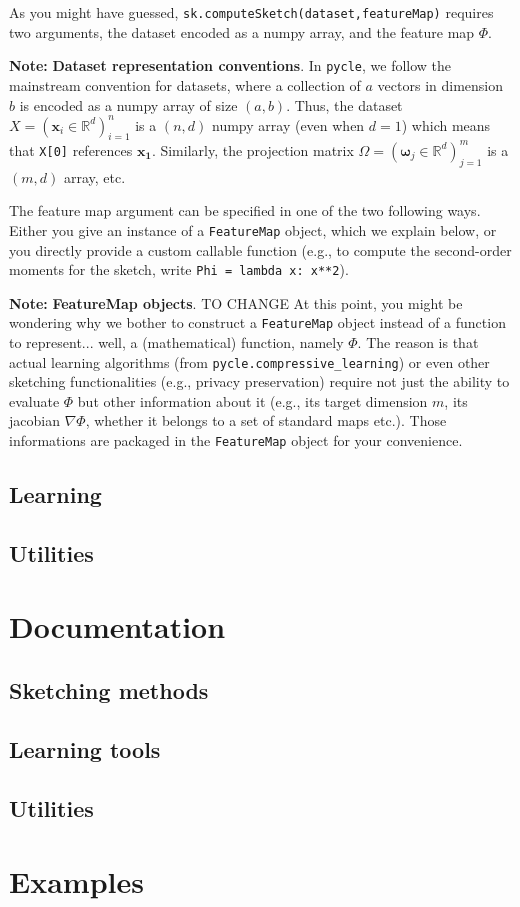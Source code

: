 \documentclass[]{article}
\newcommand{\note}[1]{\begin{noteBox} \textbf{Note:} #1 \end{noteBox}}
\newcommand{\code}{\texttt}
\renewcommand{\Vec}[1]{\bm{#1}} %
\begin{document}
As you might have guessed, \code{sk.computeSketch(dataset,featureMap)} requires two arguments, the dataset encoded as a numpy array, and the feature map $\Phi$.

\note{\textbf{Dataset representation conventions}.
In \code{pycle}, we follow the mainstream convention for datasets, where a collection of $a$ vectors in dimension $b$ is encoded as a numpy array of size $(a,b)$. Thus, the dataset $X = (\Vec{x}_i \in \mathbb R^d)_{i = 1}^n$ is a $(n,d)$ numpy array (even when $d = 1$) which means that \code{X[0]} references $\Vec{x_1}$. Similarly, the projection matrix $\Omega = (\Vec{\omega}_j \in \mathbb R^d)_{j = 1}^m$ is a $(m,d)$ array, etc.}

The feature map argument can be specified in one of the two following ways. Either you give an instance of a \code{FeatureMap} object, which we explain below, or you directly provide a custom callable function (e.g., to compute the second-order moments for the sketch, write \code{Phi = lambda x: x**2}).

\note{\textbf{FeatureMap objects}. TO CHANGE
At this point, you might be wondering why we bother to construct a \code{FeatureMap} object instead of a function to represent... well, a (mathematical) function, namely $\Phi$. The reason is that actual learning algorithms (from \code{pycle.compressive\_learning}) or even other sketching functionalities (e.g., privacy preservation) require not just the ability to evaluate $\Phi$ but other information about it (e.g., its target dimension $m$, its jacobian $\nabla\Phi$, whether it belongs to a set of standard maps etc.). Those informations are packaged in the \code{FeatureMap} object for your convenience.}




\subsection{Learning} 

\subsection{Utilities} 


\section{Documentation}
\subsection{Sketching methods} 

\subsection{Learning tools} 

\subsection{Utilities} 

\section{Examples}


\newpage


\end{document}
